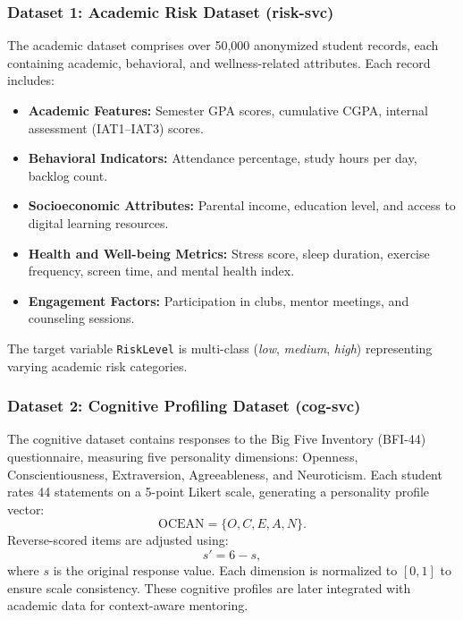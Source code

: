 \documentclass[conference]{IEEEtran}
\begin{document}
\subsubsection{Dataset 1: Academic Risk Dataset (risk-svc)}
The academic dataset comprises over 50,000 anonymized student records, each containing academic, behavioral, and wellness-related attributes. Each record includes:
\begin{itemize}
    \item \textbf{Academic Features:} Semester GPA scores, cumulative CGPA, internal assessment (IAT1–IAT3) scores.
    \item \textbf{Behavioral Indicators:} Attendance percentage, study hours per day, backlog count.
    \item \textbf{Socioeconomic Attributes:} Parental income, education level, and access to digital learning resources.
    \item \textbf{Health and Well-being Metrics:} Stress score, sleep duration, exercise frequency, screen time, and mental health index.
    \item \textbf{Engagement Factors:} Participation in clubs, mentor meetings, and counseling sessions.
\end{itemize}
The target variable \texttt{RiskLevel} is multi-class (\textit{low}, \textit{medium}, \textit{high}) representing varying academic risk categories.

\subsubsection{Dataset 2: Cognitive Profiling Dataset (cog-svc)}
The cognitive dataset contains responses to the Big Five Inventory (BFI-44) questionnaire, measuring five personality dimensions: Openness, Conscientiousness, Extraversion, Agreeableness, and Neuroticism. Each student rates 44 statements on a 5-point Likert scale, generating a personality profile vector:
\begin{equation}
    \text{OCEAN} = \{O, C, E, A, N\}.
\end{equation}
Reverse-scored items are adjusted using:
\begin{equation}
    s' = 6 - s,
\end{equation}
where $s$ is the original response value. Each dimension is normalized to $[0,1]$ to ensure scale consistency. These cognitive profiles are later integrated with academic data for context-aware mentoring.
\end{document}
